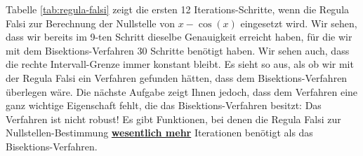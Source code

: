 Tabelle \ref{tab:regula-falsi} zeigt die ersten 12 Iterations-Schritte, wenn die Regula Falsi
zur Berechnung der Nullstelle von $x  - \cos(x)$ eingesetzt wird.  Wir sehen,
dass wir bereits im 9-ten Schritt dieselbe Genauigkeit erreicht haben, f\"ur die wir mit
dem Bisektions-Verfahren 30 Schritte ben\"otigt haben.  Wir sehen auch, dass die rechte
Intervall-Grenze immer konstant bleibt.  Es sieht so aus, als ob wir mit der Regula Falsi
ein Verfahren gefunden h\"atten, dass dem Bisektions-Verfahren \"uberlegen w\"are.  Die n\"achste Aufgabe
zeigt Ihnen jedoch, dass dem Verfahren eine ganz wichtige Eigenschaft fehlt, die das
Bisektions-Verfahren besitzt:  Das Verfahren ist nicht robust!  Es gibt Funktionen, bei
denen die Regula Falsi zur Nullstellen-Bestimmung \textbf{\underline{wesentlich mehr}} Iterationen
ben\"otigt als das Bisektions-Verfahren.
\vspace*{0.3cm}

\begin{table}[!h]
  \centering
{}
  \caption{Die ersten 12 Schritte der Regula Falsi zur L\"osung von $x - \cos(x) = 0$.}
  \label{tab:regula-falsi}
\end{table}


